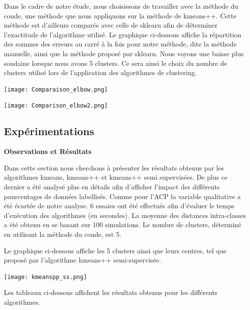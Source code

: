 \documentclass[12pt,a4paper]{book}
\newcommand{\1}{\mathds{1}}
\begin{document}
\noindent
Dans le cadre de notre étude, nous choisissons de travailler avec la méthode du coude, une méthode que nous appliquons sur la méthode de kmeans++. Cette méthode est d'ailleurs comparée avec celle de sklearn afin de déterminer l'exactitude de l'algorithme utilisé. Le graphique ci-dessous affiche la répartition des sommes des erreurs au carré à la fois pour notre méthode, dite la méthode manuelle, ainsi que la méthode proposé par sklearn. Nous voyons une baisse plus soudaine lorsque nous avons 5 clusters. Ce sera ainsi le choix du nombre de clusters utilisé lors de l'application des algorithmes de clustering.

\begin{center}
\texttt{[image: Comparaison\_elbow.png]}
\end{center}

\begin{center}
\texttt{[image: Comparison\_elbow2.png]}
\end{center}


\subsection{Expérimentations}


\vspace{5 mm}
\noindent
\begin{large}
\textbf{Observations et Résultats}
\end{large}

\noindent
Dans cette section nous cherchons à présenter les résultats obtenus par les algorithmes kmeans, kmeans++ et kmeans++ semi supervisées. De plus ce dernier a été analysé plus en détails afin d'afficher l'impact des différents pourcentages de données labellisés. Comme pour l'ACP la variable qualitative a été écartée de notre analyse.
6 essaies ont été effectués afin d'évaluer le temps d'exécution des algorithmes (en secondes). La moyenne des distances intra-classes a été obtenu en se basant sur 100 simulations. Le nombre de clusters, déterminé en utilisant la méthode du coude, est 5.

\noindent
Le graphique ci-dessous affiche les 5 clusters ainsi que leurs centres, tel que proposé par l'algorithme kmeans++ semi-supervisée.

\begin{center}
\texttt{[image: kmeanspp\_ss.png]}
\end{center}


\vspace{10 mm}
\noindent
Les tableaux ci-dessous affichent les résultats obtenus pour les différents algorithmes.
\end{document}
